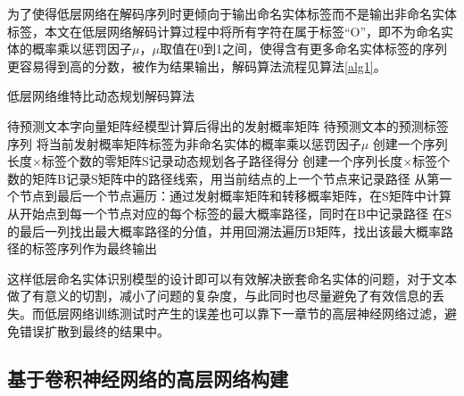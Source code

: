\documentclass[winfonts,master,oneside,nobackinfo]{njuthesis}
\begin{document}
为了使得低层网络在解码序列时更倾向于输出命名实体标签而不是输出非命名实体标签，本文在低层网络解码计算过程中将所有字符在属于标签“O”，即不为命名实体的概率乘以惩罚因子$\mu$，$\mu$取值在0到1之间，使得含有更多命名实体标签的序列更容易得到高的分数，被作为结果输出，解码算法流程见算法\ref{alg1}。


\begin{algorithm}[ht]
\caption{低层网络维特比动态规划解码算法}
\label{alg1}
\begin{algorithmic}[1]
\Require 待预测文本字向量矩阵经模型计算后得出的发射概率矩阵
\Ensure 待预测文本的预测标签序列
\State 将当前发射概率矩阵标签为非命名实体的概率乘以惩罚因子$\mu$
\State 创建一个序列长度×标签个数的零矩阵S记录动态规划各子路径得分
\State 创建一个序列长度×标签个数的矩阵B记录S矩阵中的路径线索，用当前结点的上一个节点来记录路径
\State 从第一个节点到最后一个节点遍历：通过发射概率矩阵和转移概率矩阵，在S矩阵中计算从开始点到每一个节点对应的每个标签的最大概率路径，同时在B中记录路径
\State 在S的最后一列找出最大概率路径的分值，并用回溯法遍历B矩阵，找出该最大概率路径的标签序列作为最终输出
\end{algorithmic}
\end{algorithm}

这样低层命名实体识别模型的设计即可以有效解决嵌套命名实体的问题，对于文本做了有意义的切割，减小了问题的复杂度，与此同时也尽量避免了有效信息的丢失。而低层网络训练测试时产生的误差也可以靠下一章节的高层神经网络过滤，避免错误扩散到最终的结果中。

\subsection{基于卷积神经网络的高层网络构建}
\end{document}
